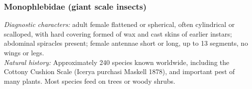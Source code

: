 \documentclass[letterpaper, 11pt]{article}
\begin{document}
\subsubsection{Monophlebidae (giant scale insects)}
\noindent{}\textit{Diagnostic characters:} adult female flattened or spherical, often cylindrical or scalloped, with hard covering formed of wax and cast skins of earlier instars; abdominal spiracles present; female antennae short or long, up to 13 segments, no wings or legs.\\

\noindent{}\textit{Natural history:} Approximately 240 species known worldwide, including the Cottony Cushion Scale (Icerya purchasi Maskell 1878), and important pest of many plants. Most species feed on trees or woody shrubs.\\
\end{document}
